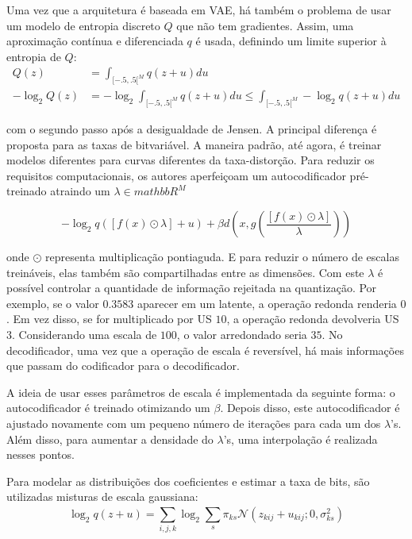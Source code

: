 Uma vez que a arquitetura é baseada em VAE, há também o problema de usar um modelo de entropia discreto $Q $ que não tem gradientes. Assim, uma aproximação contínua e diferenciada $q $ é usada, definindo um limite superior à entropia de $Q$:
\begin{equation}
\begin{aligned}
Q(z) &= \int_{[-.5,.5[^M}^{} q(z + u) du \\
-\log_2 Q(z) &= -\log_2 \int_{[-.5,.5[^M}^{} q(z + u) du \leq \int_{[-.5,.5[^M}^{} -\log_2 q(z+u) du
\end{aligned}
\end{equation}

com o segundo passo após a desigualdade de Jensen. A principal diferença é proposta para as taxas de bitvariável. A maneira padrão, até agora, é treinar modelos diferentes para curvas diferentes da taxa-distorção. Para reduzir os requisitos computacionais, os autores aperfeiçoam um autocodificador pré-treinado atraindo um $\lambda \in mathbb{R}^M$

\begin{equation}
-\log_2 q([f(x) \odot \lambda] + u) + \beta d(x, g(\frac{[f(x) \odot \lambda]}{\lambda}))
\end{equation}

onde $\odot$ representa multiplicação pontiaguda. E para reduzir o número de escalas treináveis, elas também são compartilhadas entre as dimensões. Com este $\lambda$ é possível controlar a quantidade de informação rejeitada na quantização. Por exemplo, se o valor $0.3583$ aparecer em um latente, a operação redonda renderia $0$. Em vez disso, se for multiplicado por US $10$, a operação redonda devolveria US $3$. Considerando uma escala de $100$, o valor arredondado seria $35$. No decodificador, uma vez que a operação de escala é reversível, há mais informações que passam do codificador para o decodificador.

A ideia de usar esses parâmetros de escala é implementada da seguinte forma: o autocodificador é treinado otimizando um $\beta$. Depois disso, este autocodificador é ajustado novamente com um pequeno número de iterações para cada um dos $\lambda$'s. Além disso, para aumentar a densidade do $\lambda$'s, uma interpolação é realizada nesses pontos.

Para modelar as distribuições dos coeficientes e estimar a taxa de bits, são utilizadas misturas de escala gaussiana:
\begin{equation}
\log_2 q(z+u) = \sum_{i,j,k}^{} \log_2 \sum_{s}^{} \pi_{ks} \mathcal{N}(z_{kij} + u_{kij}; 0, \sigma^2_{ks})
\end{equation}


